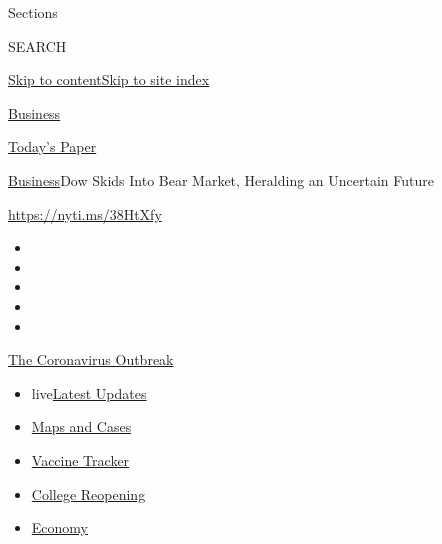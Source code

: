 Sections

SEARCH

\protect\hyperlink{site-content}{Skip to
content}\protect\hyperlink{site-index}{Skip to site index}

\href{https://www.nytimes3xbfgragh.onion/section/business}{Business}

\href{https://myaccount.nytimes3xbfgragh.onion/auth/login?response_type=cookie\&client_id=vi}{}

\href{https://www.nytimes3xbfgragh.onion/section/todayspaper}{Today's
Paper}

\href{/section/business}{Business}\textbar{}Dow Skids Into Bear Market,
Heralding an Uncertain Future

\url{https://nyti.ms/38HtXfy}

\begin{itemize}
\item
\item
\item
\item
\item
\end{itemize}

\href{https://www.nytimes3xbfgragh.onion/news-event/coronavirus?action=click\&pgtype=Article\&state=default\&region=TOP_BANNER\&context=storylines_menu}{The
Coronavirus Outbreak}

\begin{itemize}
\tightlist
\item
  live\href{https://www.nytimes3xbfgragh.onion/2020/08/03/world/coronavirus-covid-19.html?action=click\&pgtype=Article\&state=default\&region=TOP_BANNER\&context=storylines_menu}{Latest
  Updates}
\item
  \href{https://www.nytimes3xbfgragh.onion/interactive/2020/us/coronavirus-us-cases.html?action=click\&pgtype=Article\&state=default\&region=TOP_BANNER\&context=storylines_menu}{Maps
  and Cases}
\item
  \href{https://www.nytimes3xbfgragh.onion/interactive/2020/science/coronavirus-vaccine-tracker.html?action=click\&pgtype=Article\&state=default\&region=TOP_BANNER\&context=storylines_menu}{Vaccine
  Tracker}
\item
  \href{https://www.nytimes3xbfgragh.onion/2020/08/02/us/covid-college-reopening.html?action=click\&pgtype=Article\&state=default\&region=TOP_BANNER\&context=storylines_menu}{College
  Reopening}
\item
  \href{https://www.nytimes3xbfgragh.onion/live/2020/08/03/business/stock-market-today-coronavirus?action=click\&pgtype=Article\&state=default\&region=TOP_BANNER\&context=storylines_menu}{Economy}
\end{itemize}

